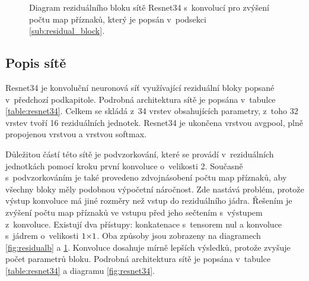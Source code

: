 \begin{figure}
\centering
{}
\caption{Diagram reziduálního bloku sítě Resnet34 s~konvolucí pro zvýšení počtu map příznaků, který je popsán v~podsekci \ref{sub:residual_block}.}
\label{fig:residualc}
\end{figure}

\subsection{Popis sítě}
\label{sub:resnet34_desc}

Resnet34 je konvoluční neuronová síť využívající reziduální bloky popsané v~předchozí podkapitole.
Podrobná architektura sítě je popsána v~tabulce \ref{table:resnet34}.
Celkem se skládá z~34 vrstev obsahujících parametry, z~toho 32 vrstev tvoří 16 reziduálních jednotek.
Resnet34 je ukončena vrstvou avgpool, plně propojenou vrstvou a vrstvou softmax.

Důležitou částí této sítě je podvzorkování, které se provádí v~reziduálních jednotkách pomocí kroku první konvoluce o~velikosti 2.
Současně s~podvzorkováním je také provedeno zdvojnásobení počtu map příznaků, aby všechny bloky měly podobnou výpočetní náročnost.
Zde nastává problém, protože výstup konvoluce má jiné rozměry než vstup do reziduálního jádra.
Řešením je zvýšení počtu map příznaků ve vstupu před jeho sečtením s~výstupem z~konvoluce.
Existují dva přístupy: konkatenace s~tensorem nul a konvoluce s~jádrem o~velikosti $\sisetup{tight-spacing=true}1{\times}1$.
Oba způsoby jsou zobrazeny na diagramech \ref{fig:residualb} a \ref{fig:residualc}.
Konvoluce dosahuje mírně lepších výsledků, protože zvyšuje počet parametrů bloku.
Podrobná architektura sítě je popsána v~tabulce \ref{table:resnet34} a diagramu \ref{fig:resnet34}.


